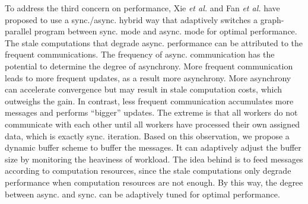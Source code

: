 To address the third concern on performance, Xie \emph{et al.} \cite{Xie2015SYNC} and Fan \emph{et al.} \cite{Fan2018Adaptive} have proposed to use a sync./async. hybrid way that adaptively switches a graph-parallel program between sync. mode and async. mode for optimal performance. The stale computations that degrade async. performance can be attributed to the frequent communications. The frequency of async. communication has the potential to determine the degree of asynchrony. More frequent communication leads to more frequent updates, as a result more asynchrony. More asynchrony can accelerate convergence but may result in stale computation costs, which outweighs the gain. In contrast, less frequent communication accumulates more messages and performs ``bigger'' updates. The extreme is that all workers do not communicate with each other until all workers have processed their own assigned data, which is exactly sync. iteration. Based on this observation, we propose a dynamic buffer scheme to buffer the messages. It can adaptively adjust the buffer size by monitoring the heaviness of workload. The idea behind is to feed messages according to computation resources, since the stale computations only degrade performance when computation resources are not enough. By this way, the degree between async. and sync. can be adaptively tuned for optimal performance.




